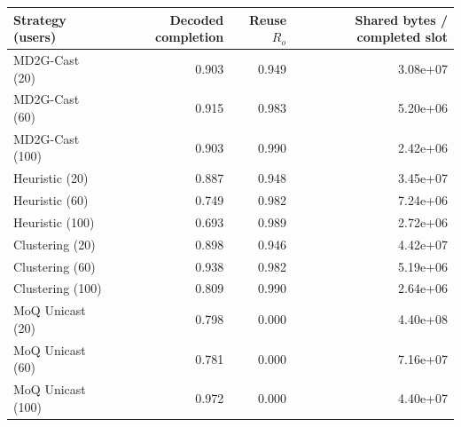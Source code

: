 \begin{tabular}{lrrr}
\hline
Strategy (users) & Decoded completion & Reuse $R_o$ & Shared bytes / completed slot \\
\hline
MD2G-Cast (20) & 0.903 & 0.949 & 3.08e+07 \\
MD2G-Cast (60) & 0.915 & 0.983 & 5.20e+06 \\
MD2G-Cast (100) & 0.903 & 0.990 & 2.42e+06 \\
Heuristic (20) & 0.887 & 0.948 & 3.45e+07 \\
Heuristic (60) & 0.749 & 0.982 & 7.24e+06 \\
Heuristic (100) & 0.693 & 0.989 & 2.72e+06 \\
Clustering (20) & 0.898 & 0.946 & 4.42e+07 \\
Clustering (60) & 0.938 & 0.982 & 5.19e+06 \\
Clustering (100) & 0.809 & 0.990 & 2.64e+06 \\
MoQ Unicast (20) & 0.798 & 0.000 & 4.40e+08 \\
MoQ Unicast (60) & 0.781 & 0.000 & 7.16e+07 \\
MoQ Unicast (100) & 0.972 & 0.000 & 4.40e+07 \\
\hline
\end{tabular}
